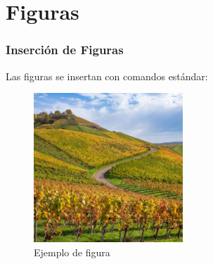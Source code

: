 \documentclass{pt-slides}
\begin{document}
\section{Figuras}

\begin{frame}
    \frametitle{Inserción de Figuras}

    Las figuras se insertan con comandos estándar:

    \begin{figure}
        \centering
        \includegraphics[width=0.5\textwidth]{figures/background}
        \caption{Ejemplo de figura}
    \end{figure}
\end{frame}
\end{document}
